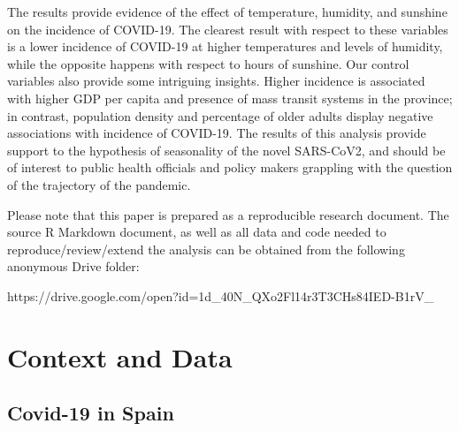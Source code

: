 \documentclass[]{elsarticle} %
\begin{document}
The results provide evidence of the effect of temperature, humidity, and
sunshine on the incidence of COVID-19. The clearest result with respect
to these variables is a lower incidence of COVID-19 at higher
temperatures and levels of humidity, while the opposite happens with
respect to hours of sunshine. Our control variables also provide some
intriguing insights. Higher incidence is associated with higher GDP per
capita and presence of mass transit systems in the province; in
contrast, population density and percentage of older adults display
negative associations with incidence of COVID-19. The results of this
analysis provide support to the hypothesis of seasonality of the novel
SARS-CoV2, and should be of interest to public health officials and
policy makers grappling with the question of the trajectory of the
pandemic.

Please note that this paper is prepared as a reproducible research
document. The source R Markdown document, as well as all data and code
needed to reproduce/review/extend the analysis can be obtained from the
following anonymous Drive folder:

https://drive.google.com/open?id=1d\_40N\_QXo2Fl14r3T3CHs84IED-B1rV\_

\hypertarget{context-and-data}{%
\section{Context and Data}\label{context-and-data}}

\hypertarget{covid-19-in-spain}{%
\subsection{Covid-19 in Spain}\label{covid-19-in-spain}}
\end{document}
